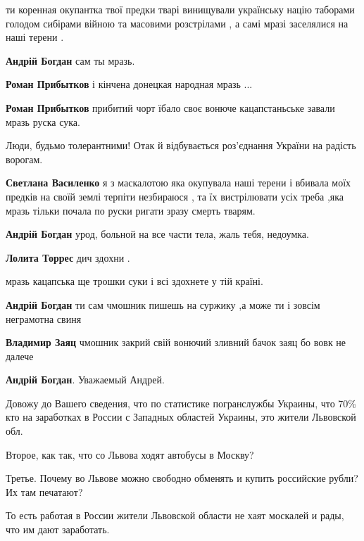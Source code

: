\begin{itemize}
ти коренная окупантка твої предки тварі винищували українську націю таборами
голодом сибірами війною та масовими розстрілами , а самі мразі заселялися на
наші терени .

\begin{itemize}

\textbf{Андрій Богдан} сам ты мразь.

\textbf{Роман Прибытков} і кінчена донецкая народная мразь ...\Laughey[1.0][white]

\textbf{Роман Прибытков} прибитий чорт їбало своє вонюче кацапстаньське завали мразь руска сука.

Люди, будьмо толерантними! Отак й відбувається роз'єднання України на радість ворогам.

\textbf{Светлана Василенко} я з маскалотою яка окупувала наші терени і вбивала моїх предків на своїй землі терпіти незбираюся , та їх вистрілювати усіх треба ,яка мразь тільки почала по руски ригати зразу смерть тварям.

\textbf{Андрій Богдан} урод, больной на все части тела, жаль тебя, недоумка.

\textbf{Лолита Торрес} дич здохни .

мразь кацапська ще трошки суки і всі здохнете у тій країні.

\textbf{Андрій Богдан} ти сам чмошник пишешь на суржику ,а може ти і зовсім неграмотна свиня

\textbf{Владимир Заяц} чмошник закрий свій вонючий зливний бачок заяц \Laughey[1.0]\Laughey[1.0]\Laughey[1.0] бо вовк не далече \Laughey[1.0]\Laughey[1.0]\Laughey[1.0]\Laughey[1.0]\Laughey[1.0]\Laughey[1.0]\Laughey[1.0]\Laughey[1.0]\Laughey[1.0]

\textbf{Андрій Богдан}. Уважаемый Андрей.

Довожу до Вашего сведения, что по статистике погранслужбы Украины, что 70\% кто
на заработках в России с Западных областей Украины, это жители Львовской обл.

Второе, как так, что со Львова ходят автобусы в Москву?

Третье. Почему во Львове можно свободно обменять и купить российские рубли?
Их там печатают?

То есть работая в России жители Львовской области не хаят москалей и рады, что им дают заработать.


\end{itemize}
\end{itemize}
